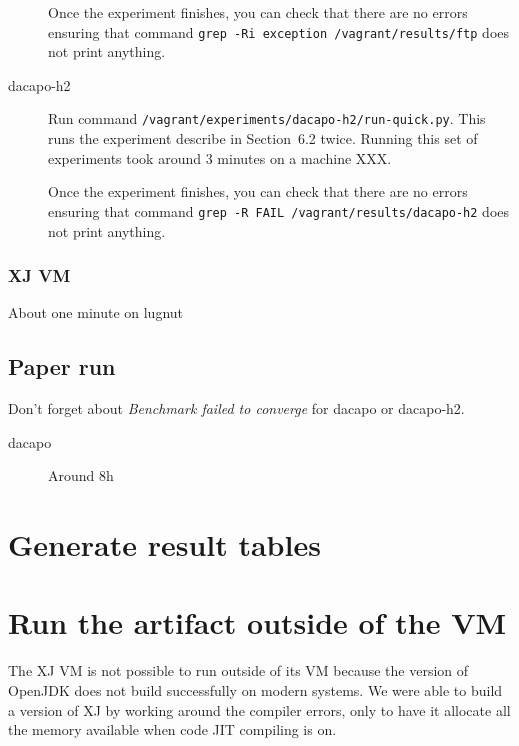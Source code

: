 \documentclass[12pt]{article}
\begin{document}
\begin{description}
        Once the experiment finishes, you can check that there are no errors
        ensuring that command \texttt{grep -Ri exception /vagrant/results/ftp}
        does not print anything.

    \item[dacapo-h2] Run command
        \texttt{/vagrant/experiments/dacapo-h2/run-quick.py}.  This runs the
        experiment describe in Section~6.2 twice.  Running this set of
        experiments took around 3 minutes on a machine XXX.

        Once the experiment finishes, you can check that there are no errors
        ensuring that command \texttt{grep -R FAIL /vagrant/results/dacapo-h2}
        does not print anything.

\end{description}

\subsubsection{XJ VM}

About one minute on lugnut

\subsection{Paper run}
\label{sec:paper-run}

Don't forget about \emph{Benchmark failed to converge} for dacapo or dacapo-h2.

\begin{description}

    \item[dacapo] Around 8h

\end{description}

\section{Generate result tables}
\label{sec:tables}

\section{Run the artifact outside of the VM}

The XJ VM is not possible to run outside of its VM because the version of
OpenJDK does not build successfully on modern systems.  We were able to build a
version of XJ by working around the compiler errors, only to have it allocate
all the memory available when code JIT compiling is on.
\end{document}

